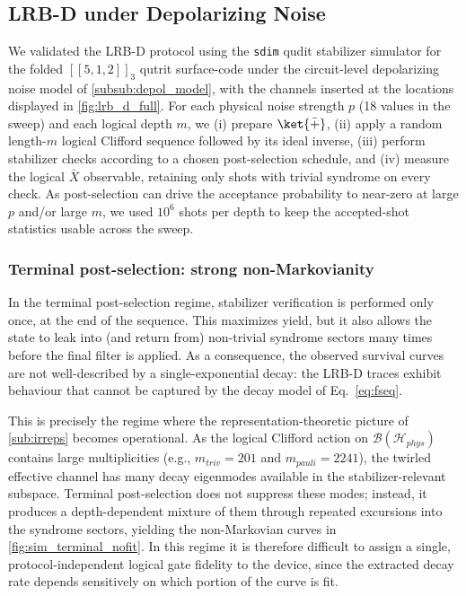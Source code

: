 \subsection{LRB-D under Depolarizing Noise}
\label{sub:simulation_results}

We validated the LRB-D protocol using the \texttt{sdim} qudit
stabilizer simulator \cite{sdim} for the folded $[[5,1,2]]_3$ qutrit
surface-code under the circuit-level
depolarizing noise model of \autoref{subsub:depol_model}, with the
channels inserted at the locations displayed in
\autoref{fig:lrb_d_full}. For each physical noise
strength $p$ (18 values in the sweep) and each logical depth $m$, we
(i) prepare $\ket{\bar{+}}$, (ii) apply a random length-$m$ logical
Clifford sequence followed by its ideal inverse, (iii) perform
stabilizer checks according to a chosen post-selection schedule, and
(iv) measure the logical $\bar{X}$ observable, retaining only shots
with trivial syndrome on every check. As post-selection can
drive the acceptance probability to near-zero at large $p$ and/or
large $m$, we used $10^6$ shots per depth to keep the accepted-shot
statistics usable across the sweep.

\subsubsection{Terminal post-selection: strong non-Markovianity}
In the terminal post-selection regime, stabilizer
verification is performed only once, at the end of the sequence. This
maximizes yield, but it also allows the state to leak into (and
return from) non-trivial syndrome sectors many times before the final
filter is applied. As a consequence, the observed survival curves are
not well-described by a single-exponential decay: the LRB-D traces
exhibit behaviour that cannot be captured by the decay model of
Eq.~\eqref{eq:fseq}.


This is precisely the regime where the representation-theoretic
picture of \autoref{sub:irreps} becomes operational. As the
logical Clifford action on $\mathcal{B}(\mathcal{H}_{phys})$ contains
large multiplicities (e.g., $m_{triv}=201$ and $m_{pauli}=2241$), the
twirled effective channel has many decay eigenmodes available in the
stabilizer-relevant subspace. Terminal post-selection does not
suppress these modes; instead, it produces a depth-dependent mixture
of them through repeated excursions into the syndrome sectors,
yielding the non-Markovian curves in \autoref{fig:sim_terminal_nofit}.
In this regime it is therefore difficult to assign a single,
protocol-independent logical gate fidelity to the device, since
the extracted decay rate depends sensitively on which portion of the
curve is fit.

